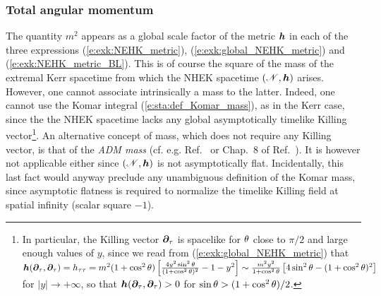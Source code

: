 \subsubsection{Total angular momentum}

The quantity $m^2$ appears as a global scale factor of the metric $\bm{h}$ in
each of the three expressions (\ref{e:exk:NEHK_metric}), (\ref{e:exk:global_NEHK_metric})
and (\ref{e:exk:NEHK_metric_BL}). This is of course the square of the mass of the extremal
Kerr spacetime from which the NHEK spacetime $(\mathscr{N},\bm{h})$ arises. However, one cannot
associate intrinsically a mass to the latter. Indeed, one cannot use the
Komar integral
(\ref{e:sta:def_Komar_mass}), as in the Kerr case, since the
the NHEK spacetime lacks any
global asymptotically timelike Killing vector\footnote{In particular, the Killing vector
$\bm{\partial}_\tau$ is spacelike for $\theta$ close to $\pi/2$ and large enough values of $y$, since
we read from (\ref{e:exk:global_NEHK_metric}) that
$\bm{h}(\bm{\partial}_\tau, \bm{\partial}_\tau) = h_{\tau\tau} = m^2 (1 + \cos^2\theta)
\left[ \frac{4 y^2 \sin^2\theta}{(1 + \cos^2\theta)^2} - 1 - y^2 \right]
\sim \frac{m^2 y^2}{1 + \cos^2\theta} \left[ 4 \sin^2\theta - (1 + \cos^2\theta)^2 \right]$
for $|y|\to +\infty$, so that $\bm{h}(\bm{\partial}_\tau, \bm{\partial}_\tau) > 0$ for
$\sin\theta > (1 + \cos^2\theta)/2$.}.
An alternative concept of mass, which does not require any Killing vector,
is that of the \emph{ADM mass} (cf. e.g.
Ref.~\cite{JaramG11} or
Chap.~8 of Ref.~\cite{Gourg12}). It is however not applicable either since
$(\mathscr{N},\bm{h})$ is not asymptotically flat. Incidentally, this last fact would
anyway preclude any unambiguous definition of the Komar mass, since asymptotic flatness
is required to normalize the timelike Killing field  at spatial
infinity (scalar square $-1$).

